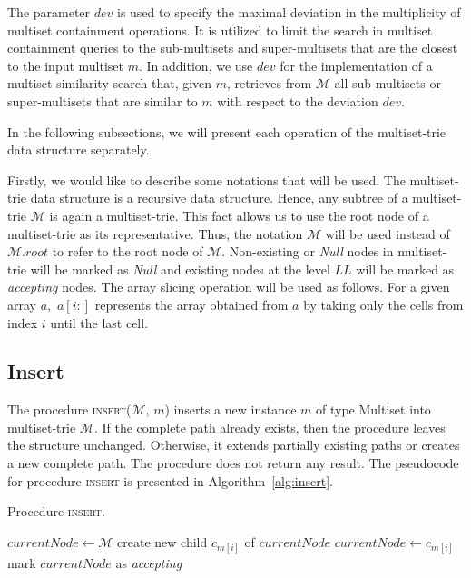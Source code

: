 \documentclass[algorithms,article,accept,pdftex,moreauthors]{Definitions/mdpi}
\begin{document}
The parameter $dev$ is used to specify the maximal deviation in the multiplicity
of multiset containment operations. It is utilized to limit the search in multiset
containment queries to the sub-multisets and super-multisets that are
the closest to the input multiset $m$. In addition, we use $dev$ for
the implementation of a multiset similarity search that, given $m$, retrieves
from $\mathcal{M}$ all sub-multisets or super-multisets that are similar to $m$
with respect to the deviation $dev$.

In the following subsections, we will present each operation of the multiset-trie 
data structure separately. 

Firstly, we would like to describe some notations that will be used. The 
multiset-trie data structure is a recursive data structure. Hence, any subtree 
of a multiset-trie $\mathcal{M}$ is again a multiset-trie. This fact allows 
us to use the root node of a multiset-trie as its representative. Thus, the notation 
$\mathcal{M}$ will be used instead of $\mathcal{M}.root$ to refer to the root 
node of $\mathcal{M}.$ Non-existing or \emph{Null} nodes in multiset-trie will 
be marked as \emph{Null} and existing nodes at the level $LL$ will be marked 
as \emph{accepting} nodes. The array slicing operation will be used as follows. 
For a given array $a,$ $a[i:]$ represents the array obtained from $a$ by taking 
only the cells from index $i$ until the last cell. 


\subsection{Insert} \label{s:insert}
The procedure \textsc{insert}($\mathcal{M}$, $m$) inserts a new instance $m$ of 
type Multiset into multiset-trie $\mathcal{M}$. If the complete path already 
exists, then the procedure leaves the structure unchanged. Otherwise, it extends 
partially existing paths or creates a new complete path. The procedure does not return 
any result. The pseudocode for procedure \textsc{insert} is presented in 
Algorithm~\ref{alg:insert}.


\begin{algorithm}[H]
\caption{Procedure \textsc{insert}.}
\label{alg:insert}
\begin{algorithmic}[1]
\State $currentNode \gets \mathcal{M}$
\State create new child $c_{m[i]}$ of $currentNode$
\EndIf
\State $currentNode \gets c_{m[i]}$
\EndFor
\State mark $currentNode$ as \emph{accepting}
\EndProcedure
\end{algorithmic}
\end{algorithm}
\end{document}
